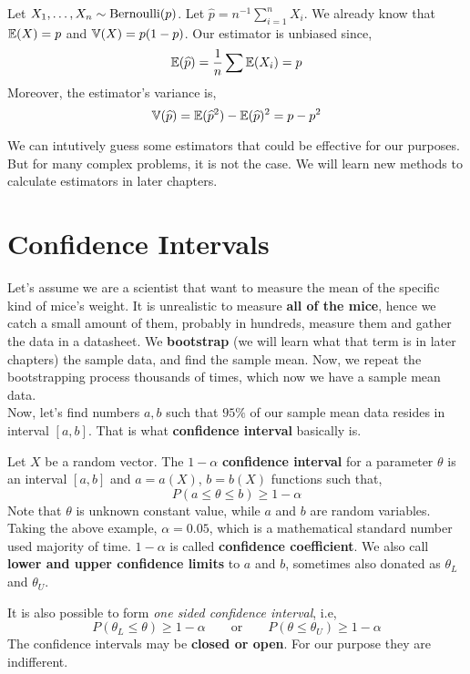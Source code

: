\begin{example}
    Let $X_1, \ldots ,X_n \sim \operatorname{Bernoulli}(p)$. Let $\widehat{p} = n^{-1}\sum_{i=1}^n X_i$. We already know that ${\mathbb{E}}(X) = p$ and ${\mathbb{V}}(X) = p(1-p)$.  Our estimator is unbiased since,
    \[ {\mathbb{E}}( \widehat{p}) = \frac{1}{n} \sum {\mathbb{E}}(X_i) = p\]
    Moreover, the estimator's variance is, 
    \[ {\mathbb{V}}(\widehat{p}) = {\mathbb{E}}(\widehat{p}^2) - {\mathbb{E}}(\widehat{p})^2 = p - p^2 \]
\end{example}
We can intutively guess some estimators that could be effective for our purposes. But for many complex problems, it is not the case. We will learn new methods to calculate estimators in later chapters.
\section{Confidence Intervals}
Let's assume we are a scientist that want to measure the mean of the specific kind of mice's weight.
It is unrealistic to measure \textbf{all of the mice}, hence we catch a small amount of them, probably in hundreds, measure them and gather the data in a datasheet. We \textbf{bootstrap} (we will learn what that term is in later chapters) the sample data, and find the sample mean. Now, we repeat the bootstrapping process thousands of times, which now we have a sample mean data.
\\
Now, let's find numbers $a,b$ such that $95\%$ of our sample mean data resides in interval $[a,b]$. That is what \textbf{confidence interval} basically is.
\begin{definition}
    Let $X$ be a random vector. The $1 - \alpha$ \textbf{confidence interval} for a parameter $\theta$ is an interval $[a,b]$ and $a = a(X)$, $b = b(X)$ functions such that,
    \[ P(a \le \theta \le b) \ge  1 - \alpha \]
    Note that $\theta$ is unknown constant value, while  $a$ and $b$ are random variables. 
   \\
   Taking the above example, $\alpha = 0.05$, which is a mathematical standard number used majority of time. $1 - \alpha$ is called \textbf{confidence coefficient}. We also call \textbf{lower and upper confidence limits} to $a$ and $b$, sometimes also donated as $\theta_{L}$ and $\theta_{U}$.
\end{definition}
It is also possible to form \textit{one sided confidence interval}, i.e,
\[ P( \theta_{L} \le \theta ) \ge 1 - \alpha  \qquad \text{or} \qquad P( \theta \le \theta_{U}) \ge 1 - \alpha\]
The confidence intervals may be \textbf{closed or open}. For our purpose they are indifferent. 


